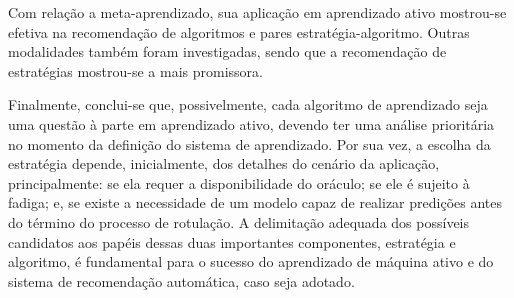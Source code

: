 Com relação a meta-aprendizado, sua aplicação em aprendizado ativo mostrou-se efetiva na recomendação de algoritmos e pares estratégia-algoritmo.
Outras modalidades também foram investigadas, sendo que a recomendação de  estratégias mostrou-se a mais promissora.

Finalmente, conclui-se que, possivelmente, cada algoritmo de aprendizado seja uma questão à parte em aprendizado ativo, devendo ter uma análise prioritária no momento da definição do sistema de aprendizado.
Por sua vez, a escolha da estratégia depende, inicialmente, dos detalhes do cenário da aplicação, principalmente: se ela requer a disponibilidade do oráculo; se ele é sujeito à fadiga; e, se existe a necessidade de um modelo capaz de realizar predições antes do término do processo de rotulação.
A delimitação adequada dos possíveis candidatos aos papéis dessas duas importantes componentes, estratégia e algoritmo, é fundamental para o sucesso do aprendizado de máquina ativo e do sistema de recomendação automática, caso seja adotado.